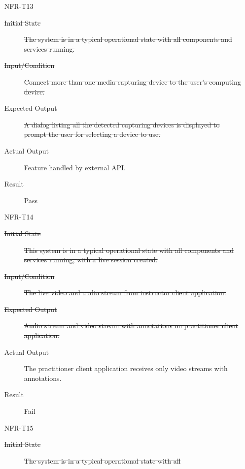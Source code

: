 \documentclass[12pt, titlepage]{article}
\begin{document}
\begin{enumerate}
    \item[NFR-T13] \label{NFRT13}
      \begin{description}
      \item[\sout{Initial State}]\sout{ The system is in a typical operational state with all
        components and services running.
      }
      \item[\sout{Input/Condition}]\sout{ Connect more than one media capturing device to the
        user’s computing device.
      }
      \item[\sout{Expected Output}]\sout{ A dialog listing all the detected capturing devices is
        displayed to prompt the user for selecting a device to use.
      }
      \item[Actual Output] Feature handled by external API.
      \item[Result] Pass
      \end{description}
    \item[NFR-T14] \label{NFRT14}
      \begin{description}
      \item[\sout{Initial State}]\sout{ This system is in a typical operational state with all
        components and services running, with a live session created.
      }
      \item[\sout{Input/Condition}]\sout{ The live video and audio stream from instructor client
        application.
      }
      \item[\sout{Expected Output}]\sout{ Audio stream and video stream with annotations on
        practitioner client application.
      }
      \item[Actual Output] The practitioner client application receives only video
        streams with annotations.
      \item[Result] Fail
      \end{description}
    \item[NFR-T15] \label{NFRT15}
      \begin{description}
      \item[\sout{Initial State}]\sout{ The system is in a typical operational state with all
}
\end{description}
\end{enumerate}
\end{document}

